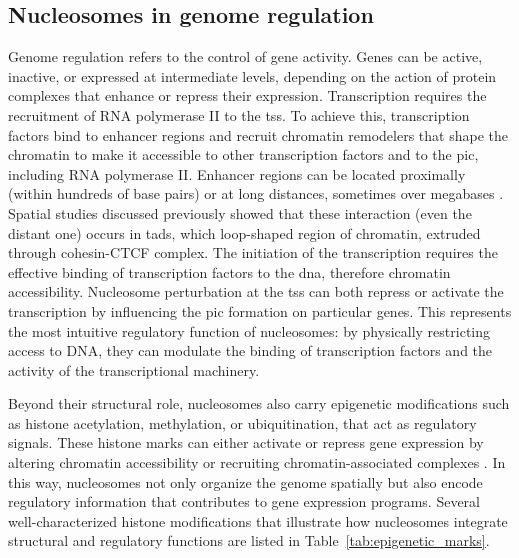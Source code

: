 \documentclass[11pt]{book}
\begin{document}
\subsection{Nucleosomes in genome regulation}
\label{subsec:genom_reg}
Genome regulation refers to the control of gene activity. Genes can be active, inactive, or expressed at intermediate levels, depending on the action of protein complexes that enhance or repress their expression. Transcription requires the recruitment of RNA polymerase II to the \gls{tss}. To achieve this, transcription factors bind to enhancer regions and recruit chromatin remodelers that shape the chromatin to make it accessible to other transcription factors and to the \gls{pic}, including RNA polymerase II. Enhancer regions can be located proximally (within hundreds of base pairs) or at long distances, sometimes over megabases \cite{soutourina_transcription_2018}. Spatial studies discussed previously showed that these interaction (even the distant one) occurs in 
\glspl{tad}, which loop-shaped region of chromatin, extruded through cohesin-CTCF complex\cite{lieberman-aiden_comprehensive_2009}.
The initiation of the transcription requires the effective binding of transcription factors to the \gls{dna}, therefore chromatin accessibility. Nucleosome perturbation at the \gls{tss} can both repress or activate the transcription by influencing the \gls{pic} formation on particular genes\cite{ichikawa_sequence-directed_2016,lai_understanding_2017}. This represents the most intuitive regulatory function of nucleosomes: by physically restricting access to DNA, they can modulate the binding of transcription factors and the activity of the transcriptional machinery.

Beyond their structural role, nucleosomes also carry epigenetic modifications such as histone acetylation, methylation, or ubiquitination, that act as regulatory signals. These histone marks can either activate or repress gene expression by altering chromatin accessibility or recruiting chromatin-associated complexes \cite{bannister_regulation_2011, allis_molecular_2016}. In this way, nucleosomes not only organize the genome spatially but also encode regulatory information that contributes to gene expression programs. Several well-characterized histone modifications that illustrate how nucleosomes integrate structural and regulatory functions are listed in Table~\ref{tab:epigenetic_marks}.
\end{document}
